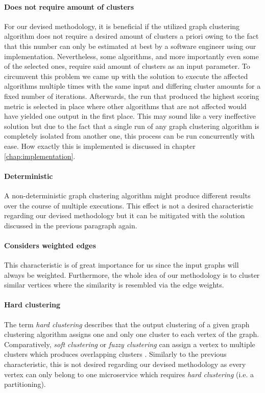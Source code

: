 \documentclass[12pt,a4paper]{report}
\begin{document}
\paragraph{Does not require amount of clusters}
For our devised methodology, it is beneficial if the utilized graph clustering
algorithm does not require a desired amount of clusters a priori owing to
the fact that this number can only be estimated at best by a software engineer
using our implementation.
Nevertheless, some algorithms, and more importantly even some of the selected ones,
require said amount of clusters as an input parameter.
To circumvent this problem we came up with the solution to execute the affected
algorithms multiple times with the same input and differing cluster amounts
for a fixed number of iterations. Afterwards, the run that produced the highest
scoring metric is selected in place where other algorithms that are not affected
would have yielded one output in the first place.
This may sound like a very ineffective solution but due to the fact that
a single run of any graph clustering algorithm is completely isolated from
another one, this process can be run concurrently with ease.
How exactly this is implemented is discussed in chapter \ref{chap:implementation}.

\paragraph{Deterministic}
A non\hyp deterministic graph clustering algorithm might produce different
results over the course of multiple executions. This effect is not a desired
characteristic regarding our devised methodology but it can be mitigated
with the solution discussed in the previous paragraph again.

\paragraph{Considers weighted edges}
This characteristic is of great importance for us since the input graphs
will always be weighted. Furthermore, the whole idea of our methodology
is to cluster similar vertices where the similarity is resembled via the edge weights.

\paragraph{Hard clustering}
The term \textit{hard clustering} describes that the output clustering
of a given graph clustering algorithm assigns one and only one cluster
to each vertex of the graph. Comparatively, \textit{soft clustering} or
\textit{fuzzy clustering} can assign a vertex to multiple clusters which
produces overlapping clusters \cite{lancichinetti2009community}.
Similarly to the previous characteristic, this is not desired regarding our
devised methodology as every vertex can only belong to one microservice
which requires \textit{hard clustering} (i.e. a partitioning).
\end{document}
